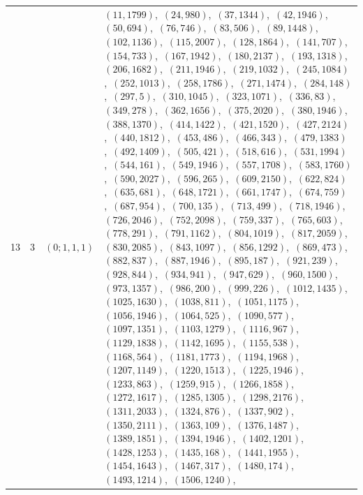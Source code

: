 \documentclass[11pt]{article}
\begin{document}
\begin{longtable}{@{}rrl>{\raggedright\arraybackslash}p{}@{}}
13 & 3 & $(0;1,1,1)$ & $(11,1799)$,\allowbreak\ $(24,980)$,\allowbreak\ $(37,1344)$,\allowbreak\ $(42,1946)$,\allowbreak\ $(50,694)$,\allowbreak\ $(76,746)$,\allowbreak\ $(83,506)$,\allowbreak\ $(89,1448)$,\allowbreak\ $(102,1136)$,\allowbreak\ $(115,2007)$,\allowbreak\ $(128,1864)$,\allowbreak\ $(141,707)$,\allowbreak\ $(154,733)$,\allowbreak\ $(167,1942)$,\allowbreak\ $(180,2137)$,\allowbreak\ $(193,1318)$,\allowbreak\ $(206,1682)$,\allowbreak\ $(211,1946)$,\allowbreak\ $(219,1032)$,\allowbreak\ $(245,1084)$,\allowbreak\ $(252,1013)$,\allowbreak\ $(258,1786)$,\allowbreak\ $(271,1474)$,\allowbreak\ $(284,148)$,\allowbreak\ $(297,5)$,\allowbreak\ $(310,1045)$,\allowbreak\ $(323,1071)$,\allowbreak\ $(336,83)$,\allowbreak\ $(349,278)$,\allowbreak\ $(362,1656)$,\allowbreak\ $(375,2020)$,\allowbreak\ $(380,1946)$,\allowbreak\ $(388,1370)$,\allowbreak\ $(414,1422)$,\allowbreak\ $(421,1520)$,\allowbreak\ $(427,2124)$,\allowbreak\ $(440,1812)$,\allowbreak\ $(453,486)$,\allowbreak\ $(466,343)$,\allowbreak\ $(479,1383)$,\allowbreak\ $(492,1409)$,\allowbreak\ $(505,421)$,\allowbreak\ $(518,616)$,\allowbreak\ $(531,1994)$,\allowbreak\ $(544,161)$,\allowbreak\ $(549,1946)$,\allowbreak\ $(557,1708)$,\allowbreak\ $(583,1760)$,\allowbreak\ $(590,2027)$,\allowbreak\ $(596,265)$,\allowbreak\ $(609,2150)$,\allowbreak\ $(622,824)$,\allowbreak\ $(635,681)$,\allowbreak\ $(648,1721)$,\allowbreak\ $(661,1747)$,\allowbreak\ $(674,759)$,\allowbreak\ $(687,954)$,\allowbreak\ $(700,135)$,\allowbreak\ $(713,499)$,\allowbreak\ $(718,1946)$,\allowbreak\ $(726,2046)$,\allowbreak\ $(752,2098)$,\allowbreak\ $(759,337)$,\allowbreak\ $(765,603)$,\allowbreak\ $(778,291)$,\allowbreak\ $(791,1162)$,\allowbreak\ $(804,1019)$,\allowbreak\ $(817,2059)$,\allowbreak\ $(830,2085)$,\allowbreak\ $(843,1097)$,\allowbreak\ $(856,1292)$,\allowbreak\ $(869,473)$,\allowbreak\ $(882,837)$,\allowbreak\ $(887,1946)$,\allowbreak\ $(895,187)$,\allowbreak\ $(921,239)$,\allowbreak\ $(928,844)$,\allowbreak\ $(934,941)$,\allowbreak\ $(947,629)$,\allowbreak\ $(960,1500)$,\allowbreak\ $(973,1357)$,\allowbreak\ $(986,200)$,\allowbreak\ $(999,226)$,\allowbreak\ $(1012,1435)$,\allowbreak\ $(1025,1630)$,\allowbreak\ $(1038,811)$,\allowbreak\ $(1051,1175)$,\allowbreak\ $(1056,1946)$,\allowbreak\ $(1064,525)$,\allowbreak\ $(1090,577)$,\allowbreak\ $(1097,1351)$,\allowbreak\ $(1103,1279)$,\allowbreak\ $(1116,967)$,\allowbreak\ $(1129,1838)$,\allowbreak\ $(1142,1695)$,\allowbreak\ $(1155,538)$,\allowbreak\ $(1168,564)$,\allowbreak\ $(1181,1773)$,\allowbreak\ $(1194,1968)$,\allowbreak\ $(1207,1149)$,\allowbreak\ $(1220,1513)$,\allowbreak\ $(1225,1946)$,\allowbreak\ $(1233,863)$,\allowbreak\ $(1259,915)$,\allowbreak\ $(1266,1858)$,\allowbreak\ $(1272,1617)$,\allowbreak\ $(1285,1305)$,\allowbreak\ $(1298,2176)$,\allowbreak\ $(1311,2033)$,\allowbreak\ $(1324,876)$,\allowbreak\ $(1337,902)$,\allowbreak\ $(1350,2111)$,\allowbreak\ $(1363,109)$,\allowbreak\ $(1376,1487)$,\allowbreak\ $(1389,1851)$,\allowbreak\ $(1394,1946)$,\allowbreak\ $(1402,1201)$,\allowbreak\ $(1428,1253)$,\allowbreak\ $(1435,168)$,\allowbreak\ $(1441,1955)$,\allowbreak\ $(1454,1643)$,\allowbreak\ $(1467,317)$,\allowbreak\ $(1480,174)$,\allowbreak\ $(1493,1214)$,\allowbreak\ $(1506,1240)$,\allowbreak\ 
\end{longtable}
\end{document}
